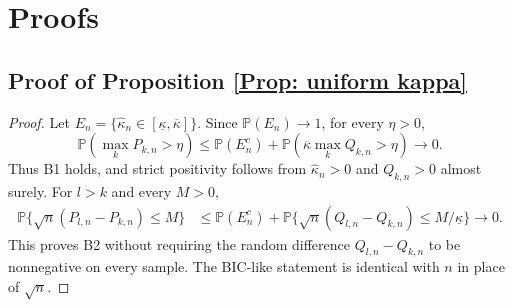 \documentclass[12pt]{article}
\newenvironment{bluechange}{\begingroup\color[rgb]{0.00,0.00,1.00}}{\endgroup}
\theoremstyle{remark}
\theoremstyle{plain}
\begin{document}
\section{Proofs}


\begin{bluechange}
\subsection{Proof of Proposition \ref{Prop: uniform kappa}}
\begin{proof}
Let $E_n=\{\widehat\kappa_n\in[\underline\kappa,\overline\kappa]\}$. Since $\mathbb P(E_n)\to1$, for every $\eta>0$,
\[
\mathbb P\left(\max_kP_{k,n}>\eta\right)
\le \mathbb P(E_n^c)+
\mathbb P\left(\overline\kappa\max_kQ_{k,n}>\eta\right)\longrightarrow0.
\]
Thus B1 holds, and strict positivity follows from $\widehat\kappa_n>0$ and $Q_{k,n}>0$ almost surely. For $l>k$ and every $M>0$,
\begin{align*}
\mathbb P\{\sqrt n(P_{l,n}-P_{k,n})\le M\}
&\le \mathbb P(E_n^c)
 +\mathbb P\{\sqrt n(Q_{l,n}-Q_{k,n})\le M/\underline\kappa\}\longrightarrow0.
\end{align*}
This proves B2 without requiring the random difference $Q_{l,n}-Q_{k,n}$ to be nonnegative on every sample. The BIC-like statement is identical with $n$ in place of $\sqrt n$.
\end{proof}


\end{bluechange}
\end{document}

